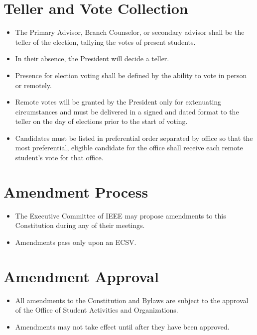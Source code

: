 \documentclass[12pt]{constitution}
\begin{document}
\section{Teller and Vote Collection}
\label{sec:elect_teller}
\begin{itemize}
    \item The Primary Advisor, Branch Counselor, or secondary advisor shall be the teller of the election, tallying the votes of present students.
    \item In their absence, the President will decide a teller.
    \item Presence for election voting shall be defined by the ability to vote in person or remotely.
    \item Remote votes will be granted by the President only for extenuating circumstances and must be delivered in a signed and dated format to the teller on the day of elections prior to the start of voting.
    \item Candidates must be listed in preferential order separated by office so that the most preferential, eligible candidate for the office shall receive each remote student's vote for that office.
\end{itemize}


\label{art:amend}

\section{Amendment Process}
\label{sec:amend_process}
\begin{itemize}
    \item The Executive Committee of IEEE may propose amendments to this Constitution during any of their meetings.
    \item Amendments pass only upon an ECSV.
\end{itemize}

\section{Amendment Approval}
\label{sec:amend_approve}
\begin{itemize}
    \item All amendments to the Constitution and Bylaws are subject to the approval of the Office of Student Activities and Organizations.
    \item Amendments may not take effect until after they have been approved.
\end{itemize}
\end{document}
